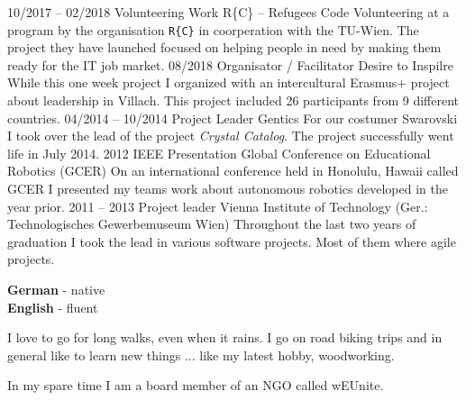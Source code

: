\documentclass[9pt]{developercv} %
\begin{document}

\begin{entrylist}
	\entry
	{10/2017 -- 02/2018}
	{Volunteering Work}
	{R\{C\} -- Refugees Code}
	{Volunteering at a program by the organisation \texttt{R\{C\}} in coorperation with the TU-Wien. The project they have launched focused on helping people in need by making them ready for the IT job market.}
	\entry
	{08/2018}
	{Organisator / Facilitator}
	{Desire to Inspilre}
	{While this one week project I organized with  an intercultural Erasmus+ project about leadership in Villach. This project included 26 participants from 9 different countries.}
	\entry
	{04/2014 -- 10/2014}
	{Project Leader}
	{Gentics}
	{For our costumer Swarovski I took over the lead of the project \textit{Crystal Catalog}. The project successfully went life in July 2014.}
	\entry
	{2012}
	{IEEE Presentation}
	{Global Conference on Educational Robotics (GCER)}
	{On an international conference held in Honolulu, Hawaii called GCER I presented my teams work about autonomous robotics developed in the year prior.}
	\entry
	{2011 -- 2013}
	{Project leader}
	{Vienna Institute of Technology (Ger.: Technologisches Gewerbemuseum Wien)}
	{Throughout the last two years of graduation I took the lead in various software projects. Most of them where agile projects.}
\end{entrylist}


\begin{minipage}[t]{0.3\textwidth}
	\vspace{-\baselineskip} %

	

	\textbf{German} - native\\
	\textbf{English} - fluent\\
\end{minipage}
\hfill
\begin{minipage}[t]{0.3\textwidth}
	\vspace{-\baselineskip} %
	
	
	I love to go for long walks, even when it rains. I go on road biking trips and in general like to learn new things ... like my latest hobby, woodworking.
\end{minipage}
\hfill
\begin{minipage}[t]{0.3\textwidth}
	\vspace{-\baselineskip} %
	
	
	In my spare time I am a board member of an NGO called wEUnite. 
\end{minipage}

\end{document}
